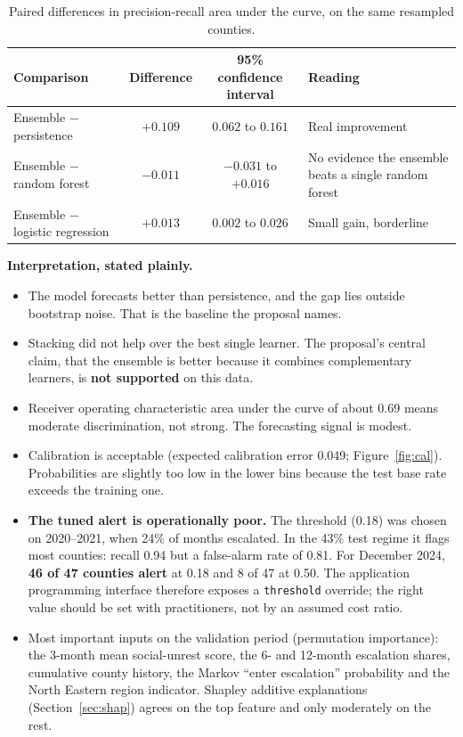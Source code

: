 \documentclass[11pt,a4paper]{article}
\newcommand{\code}[1]{\texttt{#1}}
\begin{document}
\begin{table}[!htbp]
\centering\small
\caption{Paired differences in precision-recall area under the curve, on the same resampled counties.}
\begin{tabularx}{\linewidth}{@{}lccX@{}}
\toprule
\textbf{Comparison} & \textbf{Difference} & \textbf{95\% confidence interval} & \textbf{Reading} \\
\midrule
Ensemble $-$ persistence & $+0.109$ & $0.062$ to $0.161$ & Real improvement \\
Ensemble $-$ random forest & $-0.011$ & $-0.031$ to $+0.016$ & No evidence the ensemble beats a single random forest \\
Ensemble $-$ logistic regression & $+0.013$ & $0.002$ to $0.026$ & Small gain, borderline \\
\bottomrule
\end{tabularx}
\end{table}

\textbf{Interpretation, stated plainly.}
\begin{itemize}
  \item The model forecasts better than persistence, and the gap lies outside bootstrap noise. That is the baseline the proposal names.
  \item Stacking did not help over the best single learner. The proposal's central claim, that the ensemble is better because it combines complementary learners, is \textbf{not supported} on this data.
  \item Receiver operating characteristic area under the curve of about 0.69 means moderate discrimination, not strong. The forecasting signal is modest.
  \item Calibration is acceptable (expected calibration error 0.049; Figure~\ref{fig:cal}). Probabilities are slightly too low in the lower bins because the test base rate exceeds the training one.
  \item \textbf{The tuned alert is operationally poor.} The threshold (0.18) was chosen on 2020--2021, when 24\% of months escalated. In the 43\% test regime it flags most counties: recall 0.94 but a false-alarm rate of 0.81. For December 2024, \textbf{46 of 47 counties alert} at 0.18 and 8 of 47 at 0.50. The application programming interface therefore exposes a \code{threshold} override; the right value should be set with practitioners, not by an assumed cost ratio.
  \item Most important inputs on the validation period (permutation importance): the 3-month mean social-unrest score, the 6- and 12-month escalation shares, cumulative county history, the Markov ``enter escalation'' probability and the North Eastern region indicator. Shapley additive explanations (Section~\ref{sec:shap}) agrees on the top feature and only moderately on the rest.
\end{itemize}
\end{document}
